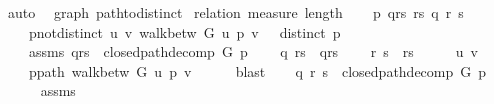 \begin{isabellebody}
\isamarkupfalse%
\ auto%
\endisatagproof
{\isafoldproof}%
%
\isadelimproof
\isanewline
%
\endisadelimproof
%
\isadeliminvisible
\isanewline
%
\endisadeliminvisible
%
\isataginvisible
{}\isamarkupfalse%
\ {\isacharparenleft}{\kern0pt}\ graph{\isacharparenright}{\kern0pt}\ path{\isacharunderscore}{\kern0pt}to{\isacharunderscore}{\kern0pt}distinct%
\endisataginvisible
{\isafoldinvisible}%
%
\isadeliminvisible
\isanewline
%
\endisadeliminvisible
%
\isadelimproof
%
\endisadelimproof
%
\isatagproof
{}\isamarkupfalse%
\ {\isacharparenleft}{\kern0pt}relation\ {\isachardoublequoteopen}measure\ length{\isachardoublequoteclose}{\isacharparenright}{\kern0pt}\isanewline
\ \ \isamarkupfalse%
\ p\ qrs\ rs\ q\ r\ s\isanewline
\ \ \isamarkupfalse%
\isanewline
\ \ \ \ p{\isacharunderscore}{\kern0pt}not{\isacharunderscore}{\kern0pt}distinct{\isacharcolon}{\kern0pt}\ {\isachardoublequoteopen}{\isacharparenleft}{\kern0pt}{\isasymexists}u\ v{\isachardot}{\kern0pt}\ walk{\isacharunderscore}{\kern0pt}betw\ G\ u\ p\ v{\isacharparenright}{\kern0pt}\ {\isasymand}\ {\isasymnot}\ distinct\ p{\isachardoublequoteclose}\ \isanewline
\ \ \ \ assms{\isacharcolon}{\kern0pt}\ {\isachardoublequoteopen}qrs\ {\isacharequal}{\kern0pt}\ closed{\isacharunderscore}{\kern0pt}path{\isacharunderscore}{\kern0pt}decomp\ G\ p{\isachardoublequoteclose}\isanewline
\ \ \ \ {\isachardoublequoteopen}{\isacharparenleft}{\kern0pt}q{\isacharcomma}{\kern0pt}\ rs{\isacharparenright}{\kern0pt}\ {\isacharequal}{\kern0pt}\ qrs{\isachardoublequoteclose}\isanewline
\ \ \ \ {\isachardoublequoteopen}{\isacharparenleft}{\kern0pt}r{\isacharcomma}{\kern0pt}\ s{\isacharparenright}{\kern0pt}\ {\isacharequal}{\kern0pt}\ rs{\isachardoublequoteclose}\isanewline
\ \ \isamarkupfalse%
\ \isamarkupfalse%
\ u\ v\ \isanewline
\ \ \ \ p{\isacharunderscore}{\kern0pt}path{\isacharcolon}{\kern0pt}\ {\isachardoublequoteopen}walk{\isacharunderscore}{\kern0pt}betw\ G\ u\ p\ v{\isachardoublequoteclose}\isanewline
\ \ \ \ \isamarkupfalse%
\ blast\isanewline
\ \ \isamarkupfalse%
\ {\isachardoublequoteopen}{\isacharparenleft}{\kern0pt}q{\isacharcomma}{\kern0pt}\ r{\isacharcomma}{\kern0pt}\ s{\isacharparenright}{\kern0pt}\ {\isacharequal}{\kern0pt}\ closed{\isacharunderscore}{\kern0pt}path{\isacharunderscore}{\kern0pt}decomp\ G\ p{\isachardoublequoteclose}\isanewline
\ \ \ \ \isamarkupfalse%
\ assms\isanewline
\ \ \ \ \isamarkupfalse%

\end{isabellebody}
